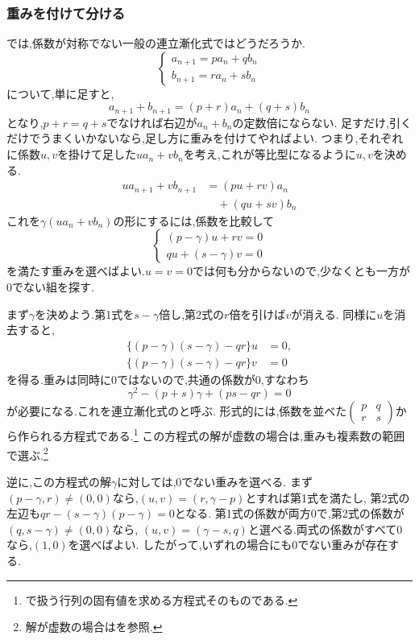 \subsubsection{重みを付けて分ける}
では,係数が対称でない一般の連立漸化式ではどうだろうか.
\[
  \begin{cases}
    a_{n+1}=pa_n+qb_n\\
    b_{n+1}=ra_n+sb_n
  \end{cases}
\]
について,単に足すと,
\[
  a_{n+1}+b_{n+1}=(p+r)a_n+(q+s)b_n
\]
となり,$p+r=q+s$でなければ右辺が$a_n+b_n$の定数倍にならない.
足すだけ,引くだけでうまくいかないなら,足し方に重みを付けてやればよい.
つまり,それぞれに係数$u,v$を掛けて足した$u a_n+v b_n$を考え,これが等比型になるように$u,v$を決める.
\[
  \begin{aligned}
    u a_{n+1}+v b_{n+1}
    &=(pu+rv)a_n\\
    &\quad+(qu+sv)b_n
  \end{aligned}
\]
これを$\gamma(u a_n+v b_n)$の形にするには,係数を比較して
\[
  \begin{cases}
    (p-\gamma)u+rv=0\\
    qu+(s-\gamma)v=0
  \end{cases}
\]
を満たす重みを選べばよい.$u=v=0$では何も分からないので,少なくとも一方が0でない組を探す.

まず$\gamma$を決めよう.第1式を$s-\gamma$倍し,第2式の$r$倍を引けば$v$が消える.
同様に$u$を消去すると,
\begin{align*}
  \{(p-\gamma)(s-\gamma)-qr\}u&=0,\\
  \{(p-\gamma)(s-\gamma)-qr\}v&=0
\end{align*}
を得る.重みは同時に0ではないので,共通の係数が0,すなわち
\[
  \gamma^2-(p+s)\gamma+(ps-qr)=0
\]
が必要になる.これを連立漸化式のと呼ぶ.
形式的には,係数を並べた$\begin{pmatrix}p&q\\r&s\end{pmatrix}$から作られる方程式である.\footnote{で扱う行列の固有値を求める方程式そのものである.}
この方程式の解が虚数の場合は,重みも複素数の範囲で選ぶ.\footnote{解が虚数の場合はを参照.}

逆に,この方程式の解$\gamma$に対しては,0でない重みを選べる.
まず$(p-\gamma,r)\ne(0,0)$なら,$(u,v)=(r,\gamma-p)$とすれば第1式を満たし,
第2式の左辺も$qr-(s-\gamma)(p-\gamma)=0$となる.
第1式の係数が両方0で,第2式の係数が$(q,s-\gamma)\ne(0,0)$なら,
$(u,v)=(\gamma-s,q)$と選べる.両式の係数がすべて0なら,$(1,0)$を選べばよい.
したがって,いずれの場合にも0でない重みが存在する.

